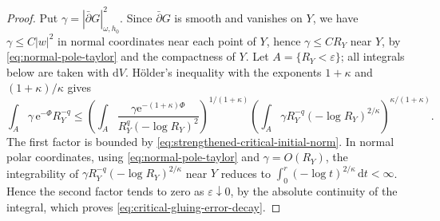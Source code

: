 \begin{proof}
Put $\gamma=|\bar\partial G|_{\omega,h_0}^2$. Since $\bar\partial G$ is smooth and vanishes on $Y$, we have $\gamma\leq C|w|^2$ in normal coordinates near each point of $Y$, hence $\gamma\leq CR_Y$ near $Y$, by \eqref{eq:normal-pole-taylor} and the compactness of $Y$. Let $A=\{R_Y<\varepsilon\}$; all integrals below are taken with $\mathrm dV$. H\"older's inequality with the exponents $1+\kappa$ and $(1+\kappa)/\kappa$ gives
\[
 \int_A\gamma\,\mathrm e^{-\Phi}R_Y^{-q}
 \leq\left(\int_A\frac{\gamma\mathrm e^{-(1+\kappa)\Phi}}
                             {R_Y^q(-\log R_Y)^2}\right)^{1/(1+\kappa)}
      \left(\int_A\gamma R_Y^{-q}(-\log R_Y)^{2/\kappa}\right)^{\kappa/(1+\kappa)}.
\]
The first factor is bounded by \eqref{eq:strengthened-critical-initial-norm}. In normal polar coordinates, using \eqref{eq:normal-pole-taylor} and $\gamma=O(R_Y)$, the integrability of $\gamma R_Y^{-q}(-\log R_Y)^{2/\kappa}$ near $Y$ reduces to $\int_0^r(-\log t)^{2/\kappa}\,\mathrm dt<\infty$. Hence the second factor tends to zero as $\varepsilon\downarrow0$, by the absolute continuity of the integral, which proves \eqref{eq:critical-gluing-error-decay}.
\end{proof}

